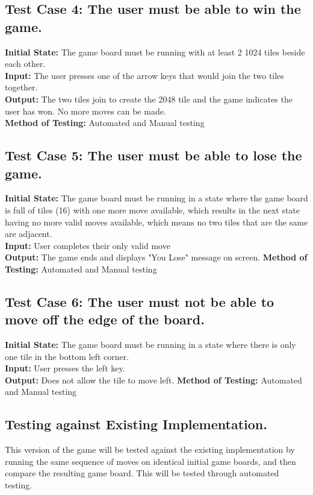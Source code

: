 \documentclass[12pt]{article}
\begin{document}
\subsection{Test Case 4: The user must be able to win the game.}

\textbf{Initial State:} The game board must be running with at least 2 1024 tiles beside 
each other.\\
\textbf{Input:} The user presses one of the arrow keys that would join the two tiles 
together.\\
\textbf{Output:} The two tiles join to create the 2048 tile and the game indicates the 
user has won. No more moves can be made.\\
\textbf{Method of Testing:} Automated and Manual testing

\subsection{Test Case 5: The user must be able to lose the game.}

\textbf{Initial State:} The game board must be running in a state where the game board 
is full of tiles (16) with one more move available, which results in the next 
state having no more valid moves available, which means no two tiles that are 
the same are adjacent.\\
\textbf{Input:} User completes their only valid move\\
\textbf{Output:} The game ends and displays "You Lose" message on screen.
\textbf{Method of Testing:} Automated and Manual testing

\subsection{Test Case 6: The user must not be able to move off the edge of the board.}

\textbf{Initial State:} The game board must be running in a state where there is only one tile in the bottom left corner.\\
\textbf{Input:} User presses the left key.\\
\textbf{Output:} Does not allow the tile to move left.
\textbf{Method of Testing:} Automated and Manual testing

\subsection{Testing against Existing Implementation.}
This version of the game will be tested against the existing implementation by running the same sequence of moves on identical initial game boards, and then compare the resulting game board. This will be tested through automated testing. 
\end{document}
